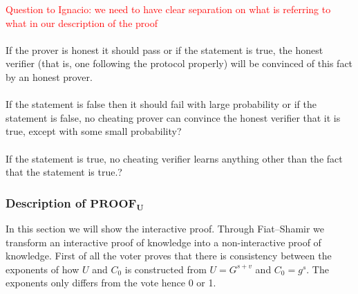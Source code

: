 \begin{infobox}
\textcolor{red}{Question to Ignacio: we need to have clear separation on what is referring to what in our description of the proof}\\\\
 If the prover is honest it should pass or if the statement is true, the honest verifier (that is, one following the protocol properly)
will be convinced of this fact by an honest prover.\\\\
If the statement is false then it should fail with large probability or if the statement is false, no cheating prover can convince
the honest verifier that it is true, except with some small probability?\\\\
 If the statement is true, no cheating verifier learns anything other than the fact that the statement is true.?
\end{infobox}

\subsubsection{Description of $ \mathbf{PROOF_U} $}
In this section we will show the interactive proof. Through Fiat–Shamir  we transform an interactive proof of knowledge into a non-interactive proof of knowledge. First of all the voter proves that there is consistency between the exponents of how \begin{math}U\end{math} and \begin{math}C_0\end{math} is constructed from \begin{math}U=G^{s+v}\end{math} and \begin{math}C_0 = g^s\end{math}. The exponents only differs from the vote hence 0 or 1.\\

